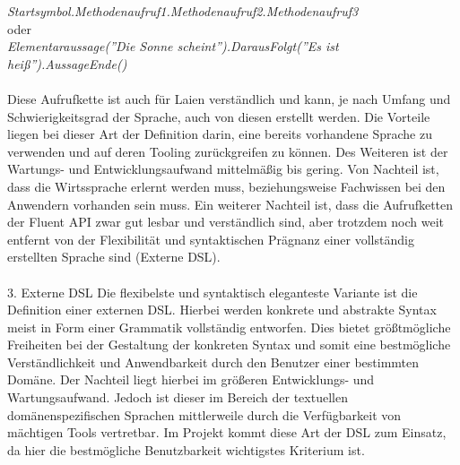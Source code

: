 \documentclass[11pt,a4paper,bibtotocnumbered]{scrreprt}
\begin{document}
\emph{Startsymbol.Methodenaufruf1.Methodenaufruf2.Methodenaufruf3}\\
oder\\
\emph{Elementaraussage(''Die Sonne scheint'').DarausFolgt(''Es ist heiß'').AussageEnde()}
\\
\\
Diese Aufrufkette ist auch für Laien verständlich und kann, je nach Umfang und Schwierigkeitsgrad der Sprache, auch von diesen erstellt werden. Die Vorteile liegen bei dieser Art der Definition darin, eine bereits vorhandene Sprache zu verwenden und auf deren Tooling zurückgreifen zu können. Des Weiteren ist der Wartungs- und Entwicklungsaufwand mittelmäßig bis gering. Von Nachteil ist, dass die Wirtssprache erlernt werden muss, beziehungsweise Fachwissen bei den Anwendern vorhanden sein muss. Ein weiterer Nachteil ist, dass die Aufrufketten der Fluent API zwar gut lesbar und verständlich sind, aber trotzdem noch weit entfernt von der Flexibilität und syntaktischen Prägnanz einer vollständig erstellten Sprache sind (Externe DSL).
\\
\\
3. Externe DSL
Die flexibelste und syntaktisch eleganteste Variante ist die Definition einer externen DSL. Hierbei werden konkrete und abstrakte Syntax meist in Form einer Grammatik vollständig entworfen. Dies bietet größtmögliche Freiheiten bei der Gestaltung der konkreten Syntax und somit eine bestmögliche Verständlichkeit und Anwendbarkeit durch den Benutzer einer bestimmten Domäne. Der Nachteil liegt hierbei im größeren Entwicklungs- und Wartungsaufwand. Jedoch ist dieser im Bereich der textuellen domänenspezifischen Sprachen mittlerweile durch die Verfügbarkeit von mächtigen Tools vertretbar.
Im Projekt kommt diese Art der DSL zum Einsatz, da hier die bestmögliche Benutzbarkeit wichtigstes Kriterium ist.
\end{document}
